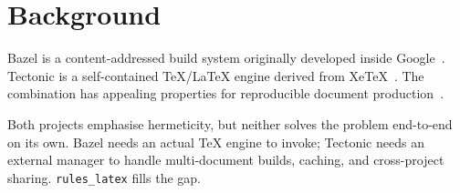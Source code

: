\chapter{Background}
\label{ch:background}

Bazel is a content-addressed build system originally developed inside
Google~\cite{google2007blaze}. Tectonic is a self-contained TeX/LaTeX
engine derived from XeTeX~\cite{tectonic2025}. The combination has
appealing properties for reproducible document
production~\cite{morgenthaler2012searching}.

Both projects emphasise hermeticity, but neither solves the problem
end-to-end on its own. Bazel needs an actual TeX engine to invoke;
Tectonic needs an external manager to handle multi-document builds,
caching, and cross-project sharing. \texttt{rules\_latex} fills the
gap.
